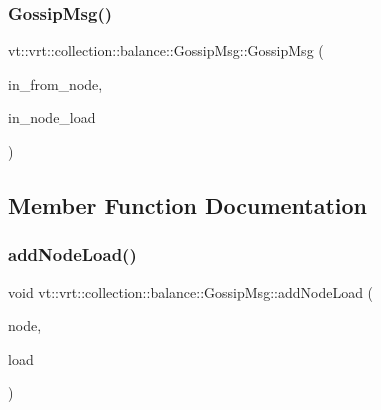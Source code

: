 \mbox{\label{structvt_1_1vrt_1_1collection_1_1balance_1_1_gossip_msg_a9ffebd54d8397a1e5efbd089524e53f2}} 
\subsubsection{\texorpdfstring{Gossip\+Msg()}{GossipMsg()}\hspace{0.1cm}{\footnotesize\ttfamily [2/2]}}
{\footnotesize\ttfamily vt\+::vrt\+::collection\+::balance\+::\+Gossip\+Msg\+::\+Gossip\+Msg (\begin{DoxyParamCaption}\item[{\hyperlink{namespacevt_a866da9d0efc19c0a1ce79e9e492f47e2}{Node\+Type}}]{in\+\_\+from\+\_\+node,  }\item[{\hyperlink{structvt_1_1vrt_1_1collection_1_1balance_1_1_gossip_msg_a8deef056cb137cfd67540a31be189122}{Node\+Load\+Type} const \&}]{in\+\_\+node\+\_\+load }\end{DoxyParamCaption})\hspace{0.3cm}{\ttfamily [inline]}}



\subsection{Member Function Documentation}
\mbox{\label{structvt_1_1vrt_1_1collection_1_1balance_1_1_gossip_msg_ad71cb026dce420d7c5e48d0fd87c2e61}} 
\subsubsection{\texorpdfstring{add\+Node\+Load()}{addNodeLoad()}}
{\footnotesize\ttfamily void vt\+::vrt\+::collection\+::balance\+::\+Gossip\+Msg\+::add\+Node\+Load (\begin{DoxyParamCaption}\item[{\hyperlink{namespacevt_a866da9d0efc19c0a1ce79e9e492f47e2}{Node\+Type}}]{node,  }\item[{\hyperlink{structvt_1_1vrt_1_1collection_1_1lb_1_1_base_l_b_a215e22b9f12678303f49615ae3be05cc}{lb\+::\+Base\+L\+B\+::\+Load\+Type}}]{load }\end{DoxyParamCaption})\hspace{0.3cm}{\ttfamily [inline]}}

